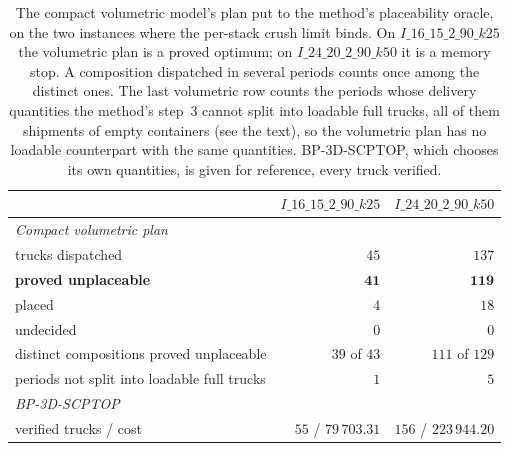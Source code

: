 \begin{table}[!t]
\centering
\small
\caption{The compact volumetric model's plan put to the method's
placeability oracle, on the two instances where the per-stack crush
limit binds. On $I\_16\_15\_2\_90\_k25$ the volumetric plan is a proved
optimum; on $I\_24\_20\_2\_90\_k50$ it is a memory stop. A composition
dispatched in several periods counts once among the distinct ones. The
last volumetric row counts the periods whose delivery quantities the
method's step~3 cannot split into loadable full trucks, all of them
shipments of empty containers (see the text), so the volumetric plan
has no loadable counterpart with the same quantities. BP-3D-SCPTOP,
which chooses its own quantities, is given for reference, every truck
verified.}
\label{tab:repack}
\begin{tabular}{lrr}
\toprule
 & $I\_16\_15\_2\_90\_k25$ & $I\_24\_20\_2\_90\_k50$ \\
\midrule
\multicolumn{3}{l}{\emph{Compact volumetric plan}} \\
trucks dispatched                        & $45$ & $137$ \\
\textbf{proved unplaceable}              & $\mathbf{41}$ & $\mathbf{119}$ \\
placed                                   & $4$  & $18$ \\
undecided                                & $0$  & $0$ \\
distinct compositions proved unplaceable & $39$ of $43$ & $111$ of $129$ \\
periods not split into loadable full trucks & $1$ & $5$ \\
\midrule
\multicolumn{3}{l}{\emph{BP-3D-SCPTOP}} \\
verified trucks / cost                   & $55$ / $79\,703.31$ & $156$ / $223\,944.20$ \\
\bottomrule
\end{tabular}
\end{table}
